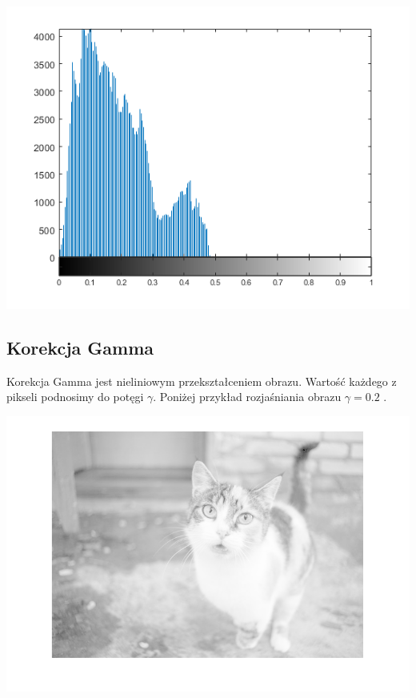 \documentclass{article}
\begin{document}
	\begin{center}
		\includegraphics[width=\linewidth]{../../lab02/cat_contrast_hist.png}
		\label{fig:cat_contrast_hist}
	\end{center}
	
	
	\subsection{Korekcja Gamma}
	Korekcja Gamma jest nieliniowym przekształceniem obrazu. Wartość każdego z pikseli podnosimy do potęgi $\gamma$. Poniżej przykład rozjaśniania obrazu $\gamma = 0.2$ .
	
	\begin{center}
		\includegraphics[width=\linewidth]{../../lab02/cat_gamma.png}
		\label{fig:cat_gamma}
	\end{center}
	
\end{document}
